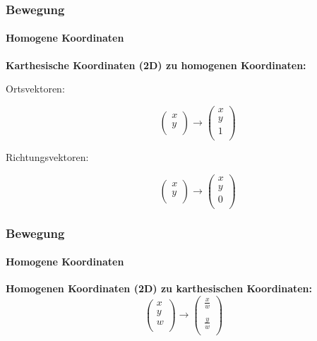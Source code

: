 \documentclass[dvips,12pt,xcolor=table]{beamer}
\begin{document}
\begin{frame}
\frametitle{Bewegung}
\framesubtitle{Homogene Koordinaten}
\textbf{Karthesische Koordinaten (2D) zu homogenen Koordinaten:}
\begin{description}
 \item[Ortsvektoren:]
  \begin{equation}
   \left(\begin{array}{c}
    x \\
    y \\
   \end{array}\right)
   \rightarrow
   \left(\begin{array}{c}
    x \\
    y \\
    1 \\
   \end{array}\right)
  \end{equation}

 \item[Richtungsvektoren:]
  \begin{equation}
   \left(\begin{array}{c}
    x \\
    y \\
   \end{array}\right)
   \rightarrow
   \left(\begin{array}{c}
    x \\
    y \\
    0 \\
   \end{array}\right)
  \end{equation}
\end{description}
\end{frame}

\begin{frame}
\frametitle{Bewegung}
\framesubtitle{Homogene Koordinaten}
\textbf{Homogenen Koordinaten (2D) zu karthesischen Koordinaten: \\}
\begin{equation}
 \left(\begin{array}{c}
  x \\
  y \\
  w \\
 \end{array}\right)
 \rightarrow
 \left(\begin{array}{c}
  \frac{x}{w} \\
  \\
  \frac{y}{w} \\
 \end{array}\right)
\end{equation}
\end{frame}
\end{document}
